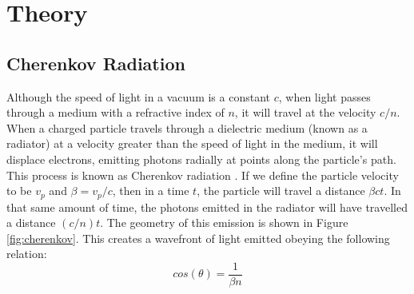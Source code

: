 
\chapter{Theory}
\label{ch:Theory}

\section{Cherenkov Radiation}
\label{sec:cherenkov}
Although the speed of light in a vacuum is a constant $c$, when light passes through a medium with a refractive index of $n$, it will travel at the velocity $c/n$.
When a charged particle travels through a dielectric medium (known as a radiator) at a velocity greater than the speed of light in the medium, it will displace electrons, emitting photons radially at points along the particle's path.
This process is known as Cherenkov radiation \cite{cherenkov}.
If we define the particle velocity to be $v_p$ and $\beta = v_p / c$, then in a time $t$, the particle will travel a distance $\beta ct$.
In that same amount of time, the photons emitted in the radiator will have travelled a distance $(c/n)t$.
The geometry of this emission is shown in Figure \ref{fig:cherenkov}.
This creates a wavefront of light emitted obeying the following relation:
\begin{equation}
    cos(\theta) = \frac{1}{\beta n}
    \label{eq:cherenkovAngle}
\end{equation}

